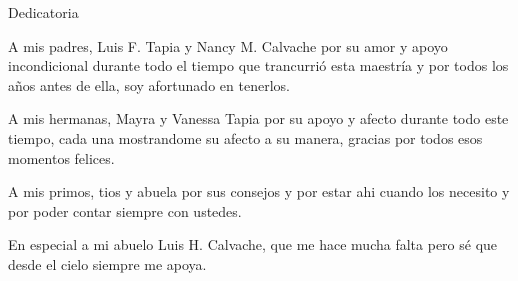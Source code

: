 \vspace*{2.5cm}

\begin{center}
{\large Dedicatoria}
\end{center}
\vspace{1cm}

\hspace*{0.4 cm} A mis padres, Luis F. Tapia y Nancy M. Calvache por su amor y apoyo incondicional durante todo el tiempo que trancurri\'o esta maestr\'ia y por todos los a\~nos antes de ella, soy afortunado en tenerlos.

\hspace*{0.4 cm} A mis hermanas, Mayra y Vanessa Tapia por su apoyo y afecto durante todo este tiempo, cada una mostrandome su afecto a su manera, gracias por todos esos momentos felices.

\hspace*{0.4 cm} A mis primos, tios y abuela por sus consejos y por estar ahi cuando los necesito y por poder contar siempre con ustedes.

\hspace*{0.4 cm} En especial a mi abuelo Luis H. Calvache, que me hace mucha falta pero s\'e que desde el cielo siempre me apoya.

\newpage
